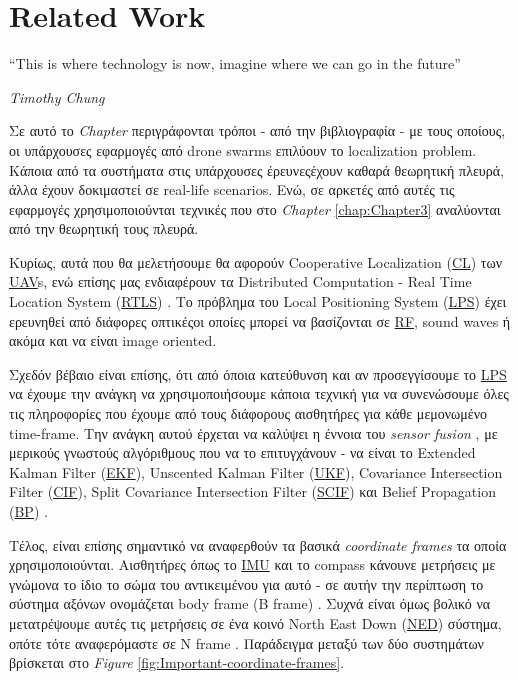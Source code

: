 \chapter{Related Work} \label{chap:Chapter2}       
\epigraph{``This is where technology is now, imagine where we can go in the future” }{\textit{Timothy Chung}}

Σε αυτό το \emph{Chapter} περιγράφονται τρόποι - από την βιβλιογραφία - με τους οποί\-ους, οι υπάρχουσες εφαρμογές 
από drone swarms επιλύουν το localization pro\-blem. Κάποια από τα συστήματα στις υπάρχουσες έρευνες\udot έχουν καθαρά
θεωρητική πλευρά, άλλα έχουν δοκιμαστεί σε real-life scenarios.
Ενώ, σε αρκετές από αυτές τις εφαρμογές χρησιμοποιούνται τεχνικές που στο \emph{Chapter} \ref{chap:Chapter3} αναλύονται από την θεωρητική τους πλευρά.

Κυρίως, αυτά που θα μελετήσουμε θα αφορούν Cooperative Localization (\hyperref[abbr:CL]{CL}) των \hyperref[abbr:UAV]{UAV}s, ενώ επίσης
μας ενδιαφέρουν τα Distributed Computation - Real Time Location System (\hyperref[abbr:RTLS]{RTLS}) \cite{rtls}. Το πρόβλημα του Local Positioning System 
(\hyperref[abbr:LPS]{LPS}) \cite{lps} έχει ερευνηθεί από διάφορες οπτικές\udot οι οποίες μπορεί να βασίζονται σε 
\hyperref[abbr:RF]{RF}, sound waves ή ακόμα και να είναι image oriented.

Σχεδόν βέβαιο είναι επίσης, ότι από όποια κατεύθυνση και αν προσεγγίσουμε το \hyperref[abbr:LPS]{LPS} να έχουμε την ανάγκη να 
χρησιμοποιήσουμε κάποια τεχνική για να συνενώσουμε όλες τις πληροφορίες που έχουμε από τους διάφορους αισθητήρες για κάθε μεμονωμένο 
time-frame. Την ανάγκη αυτού έρχεται να καλύψει η έννοια του \emph{sensor fusion} \cite{sensor-fusion}, με μερικούς γνωστούς 
αλγόριθμους που να το επιτυγχάνουν - να είναι το  
Extended Kalman Filter (\hyperref[abbr:EKF]{EKF}), Unscented Kalman Filter (\hyperref[abbr:UKF]{UKF}), Covariance Intersection  
Filter (\hyperref[abbr:CIF]{CIF}),  Split  Covariance  Intersection  Filter (\hyperref[abbr:SCIF]{SCIF}) και  Belief  Propagation 
(\hyperref[abbr:BP]{BP}) \cite{fusion-filters}. 

Τέλος, είναι επίσης σημαντικό να αναφερθούν τα βασικά \emph{coordinate frames} τα οποία χρησιμοποιούνται. 
Αισθητήρες όπως το \hyperref[abbr:IMU]{IMU} και το compass κάνουνε μετρήσεις με γνώμονα το ίδιο το σώμα 
του αντικειμένου για αυτό - σε αυτήν την περίπτωση το σύστημα αξόνων ονομάζεται body frame (B frame) \cite{uwb-imu-gps1}.
Συχνά είναι όμως βολικό να μετατρέψουμε αυτές τις μετρήσεις σε ένα κοινό North East Down (\hyperref[abbr:NED]{NED}) 
σύστημα, οπότε τότε αναφερόμαστε σε N frame \cite{uwb-imu-gps1} \cite{body-frames}. Παράδειγμα μεταξύ των δύο 
συστημάτων βρίσκεται στο \emph{Figure} \ref{fig:Important-coordinate-frames}.

